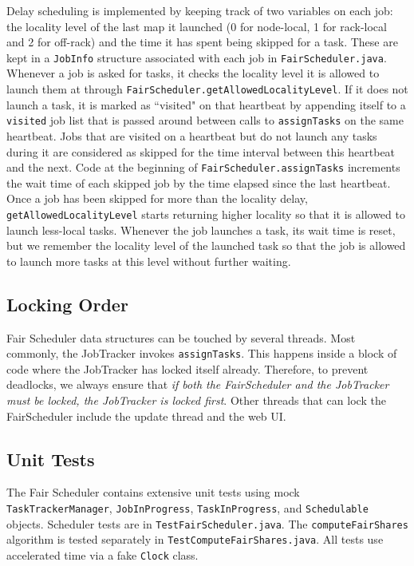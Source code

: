 \documentclass[11pt]{article}
\begin{document}
Delay scheduling is implemented by keeping track of two variables on each job: the locality level of the last map it launched (0 for node-local, 1 for rack-local and 2 for off-rack) and the time it has spent being skipped for a task. These are kept in a {\tt JobInfo} structure associated with each job in {\tt FairScheduler.java}. Whenever a job is asked for tasks, it checks the locality level it is allowed to launch them at through {\tt FairScheduler.getAllowedLocalityLevel}. If it does not launch a task, it is marked as ``visited" on that heartbeat by appending itself to a {\tt visited} job list that is passed around between calls to {\tt assignTasks} on the same heartbeat. Jobs that are visited on a heartbeat but do not launch any tasks during it are considered as skipped for the time interval between this heartbeat and the next. Code at the beginning of {\tt FairScheduler.assignTasks} increments the wait time of each skipped job by the time elapsed since the last heartbeat. Once a job has been skipped for more than the locality delay, {\tt getAllowedLocalityLevel} starts returning higher locality so that it is allowed to launch less-local tasks. Whenever the job launches a task, its wait time is reset, but we remember the locality level of the launched task so that the job is allowed to launch more tasks at this level without further waiting.

\subsection{Locking Order}

Fair Scheduler data structures can be touched by several threads. Most commonly, the JobTracker invokes {\tt assignTasks}. This happens inside a block of code where the JobTracker has locked itself already. Therefore, to prevent deadlocks, we always ensure that \emph{if both the FairScheduler and the JobTracker must be locked, the JobTracker is locked first}. Other threads that can lock the FairScheduler include the update thread and the web UI.

\subsection{Unit Tests}

The Fair Scheduler contains extensive unit tests using mock {\tt TaskTrackerManager}, {\tt JobInProgress}, {\tt TaskInProgress}, and {\tt Schedulable} objects. Scheduler tests are in {\tt TestFairScheduler.java}. The {\tt computeFairShares} algorithm is tested separately in {\tt TestComputeFairShares.java}. All tests use accelerated time via a fake {\tt Clock} class.
\end{document}
